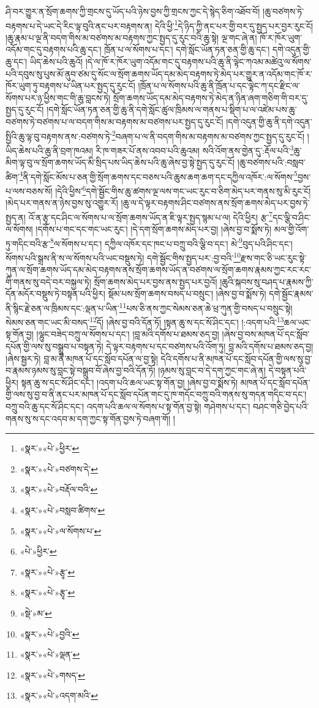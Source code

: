 ཤི་བར་གྱུར་ན་སྲོག་ཆགས་ཀྱི་གྲངས་དུ་ཡོད་པའི་ཉེས་བྱས་ཀྱི་གྲངས་ཀྱང་དེ་སྙེད་ཅིག་འཐོབ་བོ། །ཆུ་བཙགས་ཏེ་བརྟགས་པ་དེ་ཡང་དེ་རིང་ལྟ་བུའི་ནང་པར་བརྟགས་ན། དེའི་ཕྱི་\footnote{«སྣར་»«པེ་»ཕྱིར་}དེ་ཉིད་ཀྱི་ནང་པར་གྱི་བར་དུ་སྤྱད་པར་བྱར་རུང་ངོ། །ཆུ་རྣམ་པ་ལྔ་ནི་བདག་གིས་མ་བཙགས་མ་བརྟགས་ཀྱང་སྤྱད་དུ་རུང་བའི་ཆུ་སྟེ། ལྔ་གང་ཞེ་ན། ཁོ་ར་ཁོར་ཡུག་འདོམ་གང་དུ་བརྟགས་པའི་ཆུ་དང་། ཁྲོན་པ་ལ་སོགས་པ་དང་། དགེ་སློང་ཡོན་ཏན་ཅན་གྱི་ཆུ་དང་། དགེ་འདུན་གྱི་ཆུ་དང་། ཡིད་ཆེས་པའི་ཆུའོ། །དེ་ལ་ཁོ་ར་ཁོར་ཡུག་འདོམ་གང་དུ་བརྟགས་པའི་ཆུ་ནི་ལྟེང་ཀའམ་མཚེའུ་ལ་སོགས་པའི་དབུས་སུ་པུས་མོ་ནུབ་ཙམ་དུ་སོང་ལ་སྲོག་ཆགས་ཡོད་དམ་མེད་བརྟགས་ཏེ་མེད་པར་གྱུར་ན་འདོམ་གང་ཁོ་ར་ཁོར་ཡུག་ཏུ་བརྟགས་པ་ཡིན་པར་སྤྱད་དུ་རུང་ངོ། །ཁྲོན་པ་ལ་སོགས་པའི་ཆུ་ནི་ཁྲོན་པ་དང་ལྟེང་ཀ་དང་རྫིང་ལ་སོགས་པར་ཉ་ཕྱིས་གང་གི་ཆུ་བླངས་ཏེ། སྲོག་ཆགས་ཡོད་དམ་མེད་བརྟགས་ཏེ་མེད་ན་ཉིན་ཞག་གཅིག་གི་བར་དུ་སྤྱད་དུ་རུང་ངོ། །དགེ་སློང་ཡོན་ཏན་ཅན་གྱི་ཆུ་ནི་དགེ་སློང་ཚུལ་ཁྲིམས་ལ་གནས་པ་སྡིག་པ་ལ་འཛེམ་པས་ཆུ་བཙགས་ཏེ་བཙགས་པ་ལ་བདག་གིས་མ་བརྟགས་མ་བཙགས་པར་སྤྱད་དུ་རུང་ངོ། །དགེ་འདུན་གྱི་ཆུ་ནི་དགེ་འདུན་སྤྱིའི་ཆུ་ལྟ་བུ་བརྟགས་ནས་:བཙགས་ཏེ་\footnote{«སྣར་»«པེ་»བཙགས་དེ་}བཞག་པ་ལ་ནི་བདག་གིས་མ་བརྟགས་མ་བཙགས་ཀྱང་སྤྱད་དུ་རུང་ངོ། །ཡིད་ཆེས་པའི་ཆུ་ནི་བྲག་ཁའམ། རི་ཁ་གཟར་པོ་ནས་འབབ་པའི་ཆུའམ། སའི་འོག་ནས་གྱེན་དུ་:རྡོལ་པའི་\footnote{«སྣར་»«པེ་»བརྡོལ་བའི་}ཆུ་མིག་ལྟ་བུ་ལ་སྲོག་ཆགས་ཡོད་མི་སྲིད་པས་ཡིད་ཆེས་པའི་ཆུ་ཞེས་བྱ་སྟེ་སྤྱད་དུ་རུང་ངོ། །ཆུ་བཙགས་པའི་:བསླབ་ཚིག་\footnote{«སྣར་»«པེ་»བསླབ་ཚིགས་}ནི་དགེ་སློང་མོས་པ་ཅན་གྱི་སྲོག་ཆགས་དང་བཅས་པའི་ཆུས་ཆག་ཆག་དང་དཀྱིལ་འཁོར་:ལ་སོགས་\footnote{«སྣར་»«པེ་»ལ་སོགས་པ་}བྱས་པ་ལས་བཅས་སོ། །དེའི་ཕྱིས་\footnote{«པེ་»ཕྱིར་}དགེ་སྦྱོང་གིས་ཆུ་ཚགས་ལྔ་ལས་གང་ཡང་རུང་བ་ཅིག་མེད་པར་གནས་སུ་མི་རུང་ངོ། །མེད་པར་གནས་ན་ཉེས་བྱས་སུ་འགྱུར་རོ། །ཆུ་ལ་དེ་ལྟར་བརྟགས་ཤིང་བཙགས་ནས་སྲོག་ཆགས་མེད་པར་བྱས་ཏེ་སྤྱད་ན། འོ་ན་རྩྭ་དང་ཤིང་ལ་སོགས་པ་ལ་སྲོག་ཆགས་ཡོད་ན་ཇི་ལྟར་སྤྱད་སྙམ་པ་ལ། དེའི་ཕྱིར། རྩ་\footnote{«སྣར་»«པེ་»རྩྭ་}དང་ལྕི་བ་ཤིང་ལ་སོགས། །དགོས་པ་གང་དང་གང་ཡང་རུང་། །དེ་དག་སྲོག་ཆགས་མེད་པར་བྱ། །ཞེས་བྱ་བ་སྨོས་ཏེ། མལ་གྱི་འོག་ཏུ་གདིང་བའི་རྩ་\footnote{«སྣར་»«པེ་»རྩྭ་}ལ་སོགས་པ་དང་། དཀྱིལ་འཁོར་དང་ཁང་པ་བཀྲུ་བའི་ལྕི་བ་དང་། མེ་\footnote{«སྡེ་»མ་}བུད་པའི་ཤིང་དང་། སོགས་པའི་སྒྲས་ནི་ས་ལ་སོགས་པའི་ཡང་བསྡུས་ཏེ། དགེ་སྦྱོང་གིས་སྤྱད་པར་:བྱ་བའི་\footnote{«སྣར་»«པེ་»བྱའི་}རྫས་གང་ཅི་ཡང་རུང་སྟེ་ཀུན་ལ་སྲོག་ཆགས་ཡོད་དམ་མེད་བརྟགས་ནས་སྲོག་ཆགས་ཡོད་ན་བཙགས་ལ་སྲོག་ཆགས་རྣམས་ཀྱང་རང་རང་གི་གནས་སུ་བདེ་བར་བསྐྱལ་ཏེ། སྲོག་ཆགས་མེད་པར་བྱས་ནས་སྤྱད་པར་བྱའོ། །ཆུའི་སྐབས་སུ་བཤད་པ་རྣམས་ཀྱི་དོན་མདོར་བསྡུས་ཏེ་བསྟན་པའི་ཕྱིར། སྡོམ་པས་སྲོག་ཆགས་བསད་པ་བསྲུང་། །ཞེས་བྱ་བ་སྨོས་ཏེ། དགེ་སྦྱོང་རྣམས་ནི་སྙིང་རྗེ་ཅན་ལ་ཁྲིམས་དང་:ལྡན་པ་ཡིན་\footnote{«སྣར་»«པེ་»ལྡན་}པས་ཅི་ནས་ཀྱང་སེམས་ཅན་ཆེ་ཕྲ་ཀུན་གྱི་བསད་པ་བསྲུང་སྟེ། སེམས་ཅན་གང་ཡང་མི་བསད་\footnote{«སྣར་»«པེ་»གསད་}དོ། །ཞེས་བྱ་བའི་དོན་ཏོ། །སྟན་ཆུ་ས་དང་སོ་ཤིང་དང་། །:འདག་པའི་\footnote{«སྣར་»«པེ་»འདག་མའི་}ཆལ་ཡང་སྟ་གོན་བྱ། །ལྷུང་བཟེད་བཀྲུ་ལ་སོགས་པ་དང་། །བླ་མའི་དགོས་པ་ཐམས་ཅད་བྱ། །ཞེས་བྱ་བས་མཁན་པོ་དང་སློབ་དཔོན་གྱི་ལས་སུ་བསྒྲུབ་པ་བསྟན་ཏེ། དེ་ལྟར་བརྟགས་པ་དང་བཙགས་པའི་འོག་ཏུ། བླ་མའི་དགོས་པ་ཐམས་ཅད་བྱ། །ཞེས་སྦྱར་ཏེ། བླ་མ་ནི་མཁན་པོ་དང་སློབ་དཔོན་ལ་བྱ་སྟེ། དེའི་དགོས་པ་ནི་མཁན་པོ་དང་སློབ་དཔོན་གྱི་ལས་སུ་བྱ་བ་རྣམས་ཉམས་སུ་བླང་སྟེ་བསྒྲུབ་བོ་ཞེས་བྱ་བའི་དོན་ཏོ། །ཉམས་སུ་བླང་བ་དེ་དག་ཀྱང་གང་ཞེ་ན། དེ་བསྟན་པའི་ཕྱིར། སྟན་ཆུ་ས་དང་སོ་ཤིང་དང་། །འདག་པའི་ཆལ་ཡང་སྟ་གོན་བྱ། །ཞེས་བྱ་བ་སྨོས་ཏེ། མཁན་པོ་དང་སློབ་དཔོན་གྱི་ལས་སུ་བྱ་བ་ནི་ནང་པར་མཁན་པོ་དང་སློབ་དཔོན་གང་དུ་ཁ་གདོང་བཀྲུ་བའི་གནས་སུ་གདན་གདིང་བ་དང་། བཀྲུ་བའི་ཆུ་དང་སོ་ཤིང་དང་། འདག་པའི་ཆལ་ལ་སོགས་པ་སྟ་གོན་བྱ་སྟེ། གཤེགས་པ་དང་། བཤང་གཅི་བྱེད་པའི་གནས་སུ་ས་དང་འདབ་མ་དག་ཀྱང་སྟ་གོན་བྱས་ཏེ་བཞག་གོ། །
